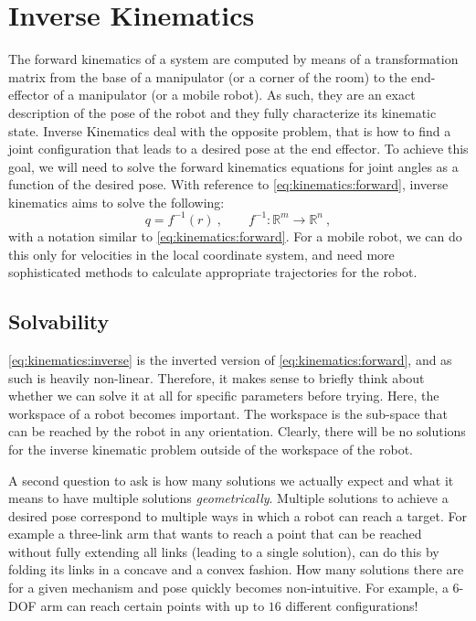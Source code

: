 \section{Inverse Kinematics}

The forward kinematics of a system are computed by means of a transformation matrix from the base of a manipulator (or a corner of the room) to the end-effector of a manipulator (or a mobile robot).
As such, they are an exact description of the pose of the robot and they fully characterize its kinematic state.
Inverse Kinematics deal with the opposite problem, that is how to find a joint configuration that leads to a desired pose at the end effector.
To achieve this goal, we will need to solve the forward kinematics equations for joint angles as a function of the desired pose.
With reference to \cref{eq:kinematics:forward}, inverse kinematics aims to solve the following:
\begin{equation}\label{eq:kinematics:inverse}
q = f^{-1} (r)\ , \qquad f^{-1} : \mathbb{R}^m \rightarrow \mathbb{R}^n \ ,
\end{equation}
with a notation similar to \cref{eq:kinematics:forward}.
For a mobile robot, we can do this only for velocities in the local coordinate system, and need more sophisticated methods to calculate appropriate trajectories for the robot.

\subsection{Solvability}

\cref{eq:kinematics:inverse} is the inverted version of \cref{eq:kinematics:forward}, and as such is heavily non-linear.
Therefore, it makes sense to briefly think about whether we can solve it at all for specific parameters before trying.
Here, the workspace of a robot becomes important. The workspace is the sub-space that can be reached by the robot in any orientation.
Clearly, there will be no solutions for the inverse kinematic problem outside of the workspace of the robot.

A second question to ask is how many solutions we actually expect and what it means to have multiple solutions \textsl{geometrically}.
Multiple solutions to achieve a desired pose correspond to multiple ways in which a robot can reach a target.
For example a three-link arm that wants to reach a point that can be reached without fully extending all links (leading to a single solution), can do this by folding its links in a concave and a convex fashion.
How many solutions there are for a given mechanism and pose quickly becomes non-intuitive.
For example, a 6-DOF arm can reach certain points with up to $16$ different configurations!

